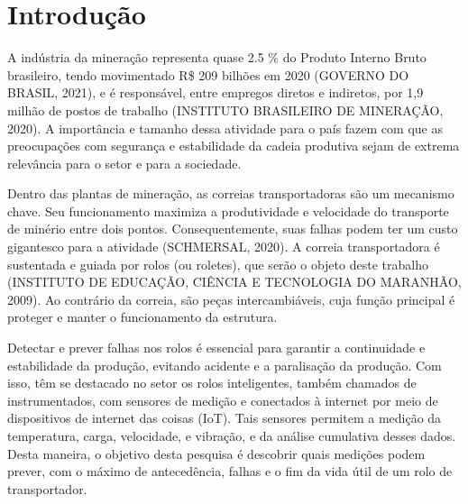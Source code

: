 
\chapter[Introdução]{Introdução}

A indústria da mineração representa quase 2.5 \% do Produto Interno Bruto brasileiro, tendo movimentado R\$ 209 bilhões em 2020 (GOVERNO DO BRASIL, 2021), e é responsável, entre empregos diretos e indiretos, por 1,9 milhão de postos de trabalho (INSTITUTO BRASILEIRO DE MINERAÇÃO, 2020). A importância e tamanho dessa atividade para o país fazem com que as preocupações com segurança e estabilidade da cadeia produtiva sejam de extrema relevância para o setor e para a sociedade.\par

Dentro das plantas de mineração, as correias transportadoras são um mecanismo chave. Seu funcionamento maximiza a produtividade e velocidade do transporte de minério entre dois pontos. Consequentemente, suas falhas podem ter um custo gigantesco para a atividade (SCHMERSAL, 2020). A correia transportadora é sustentada e guiada por rolos (ou roletes), que serão o objeto deste trabalho (INSTITUTO DE EDUCAÇÃO, CIÊNCIA E TECNOLOGIA DO MARANHÃO, 2009). Ao contrário da correia, são peças intercambiáveis, cuja função principal é proteger e manter o funcionamento da estrutura.\par

Detectar e prever falhas nos rolos é essencial para garantir a continuidade e estabilidade da produção, evitando acidente e a paralisação da produção. Com isso, têm se destacado no setor os rolos inteligentes, também chamados de instrumentados, com sensores de medição e conectados à internet por meio de dispositivos de internet das coisas (IoT). Tais sensores permitem a medição da temperatura, carga, velocidade, e vibração, e da análise cumulativa desses dados. Desta maneira, o objetivo desta pesquisa é descobrir quais medições podem prever, com o máximo de antecedência, falhas e o fim da vida útil de um rolo de transportador.


\cite{governo2021}


	
	
